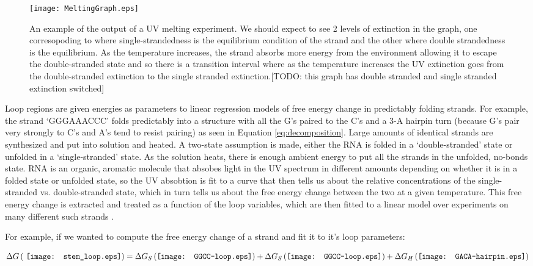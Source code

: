 \begin{figure}[h]
\centering
\texttt{[image: MeltingGraph.eps]}

\caption{An example of the output of a UV melting experiment. We
  should expect to see 2 levels of extinction in the graph, one
  corresopoding to where single-strandedness is the equilibrium
  condition of the strand and the other where double strandedness is
  the equilibrium. As the temperature increases, the strand absorbs
  more energy from the environment allowing it to escape the
  double-stranded state and so there is a transition interval where as
  the temperature increases the UV extinction goes from the
  double-stranded extinction to the single stranded extinction.[TODO:
    this graph has double stranded and single stranded extinction
    switched]}
\label{fig:UVMeltGraph}
\end{figure}

Loop regions are given energies as parameters to linear regression
models of free energy change in predictably folding strands. For
example, the strand `GGGAAACCC' folds predictably into a structure
with all the G's paired to the C's and a 3-A hairpin turn (because G's
pair very strongly to C's and A's tend to resist pairing) as seen in
Equation \ref{eq:decomposition}. Large amounts of identical strands
are synthesized and put into solution and heated. A two-state
assumption is made, either the RNA is folded in a `double-stranded'
state or unfolded in a `single-stranded' state. As the solution heats,
there is enough ambient energy to put all the strands in the unfolded,
no-bonds state. RNA is an organic, aromatic molecule that absobes
light in the UV spectrum in different amounts depending on whether it
is in a folded state or unfolded state, so the UV absobtion is fit to
a curve that then tells us about the relative concentrations of the
single-stranded vs. double-stranded state, which in turn tells us
about the free energy change between the two at a given
temperature. This free energy change is extracted and treated as a
function of the loop variables, which are then fitted to a linear
model over experiments on many different such strands
\cite{xia1998thermodynamic}.

For example, if we wanted to compute the free energy change of a
strand and fit it to it's loop parameters:

\begin{equation}
\Delta G \left ( \vcenter{\hbox{ \texttt{[image: stem\_loop.eps]}}}
 \right ) =
\Delta G_S \left ( \vcenter{\hbox{\texttt{[image: GGCC-loop.eps]}}}
\right ) +
\Delta G_S \left ( \vcenter{\hbox{\texttt{[image: GGCC-loop.eps]}}}
\right ) + 
\Delta G_H \left (\vcenter{\hbox{\texttt{[image: GACA-hairpin.eps]}}}
\right ) 
\end{equation}

